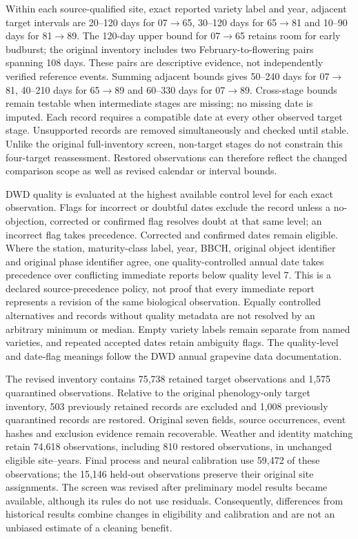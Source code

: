 \documentclass[a4paper,11pt]{article}
\begin{document}
Within each source-qualified site, exact reported variety label and year, adjacent target intervals are 20--120 days for 07$\to$65, 30--120 days for 65$\to$81 and 10--90 days for 81$\to$89. The 120-day upper bound for 07$\to$65 retains room for early budburst; the original inventory includes two February-to-flowering pairs spanning 108 days. These pairs are descriptive evidence, not independently verified reference events. Summing adjacent bounds gives 50--240 days for 07$\to$81, 40--210 days for 65$\to$89 and 60--330 days for 07$\to$89. Cross-stage bounds remain testable when intermediate stages are missing; no missing date is imputed. Each record requires a compatible date at every other observed target stage. Unsupported records are removed simultaneously and checked until stable. Unlike the original full-inventory screen, non-target stages do not constrain this four-target reassessment. Restored observations can therefore reflect the changed comparison scope as well as revised calendar or interval bounds.

DWD quality is evaluated at the highest available control level for each exact observation. Flags for incorrect or doubtful dates exclude the record unless a no-objection, corrected or confirmed flag resolves doubt at that same level; an incorrect flag takes precedence. Corrected and confirmed dates remain eligible. Where the station, maturity-class label, year, BBCH, original object identifier and original phase identifier agree, one quality-controlled annual date takes precedence over conflicting immediate reports below quality level 7. This is a declared source-precedence policy, not proof that every immediate report represents a revision of the same biological observation. Equally controlled alternatives and records without quality metadata are not resolved by an arbitrary minimum or median. Empty variety labels remain separate from named varieties, and repeated accepted dates retain ambiguity flags. The quality-level and date-flag meanings follow the DWD annual grapevine data documentation.

The revised inventory contains 75,738 retained target observations and 1,575 quarantined observations. Relative to the original phenology-only target inventory, 503 previously retained records are excluded and 1,008 previously quarantined records are restored. Original seven fields, source occurrences, event hashes and exclusion evidence remain recoverable. Weather and identity matching retain 74,618 observations, including 810 restored observations, in unchanged eligible site--years. Final process and neural calibration use 59,472 of these observations; the 15,146 held-out observations preserve their original site assignments. The screen was revised after preliminary model results became available, although its rules do not use residuals. Consequently, differences from historical results combine changes in eligibility and calibration and are not an unbiased estimate of a cleaning benefit.
\end{document}
